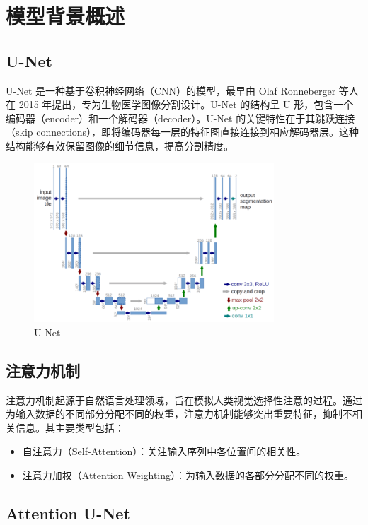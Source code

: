 \documentclass[a4paper,12pt]{report}
\begin{document}
\section{模型背景概述}

\subsection{U-Net}
U-Net 是一种基于卷积神经网络（CNN）的模型，最早由 Olaf Ronneberger 等人在 2015 年提出，专为生物医学图像分割设计。U-Net 的结构呈 U 形，包含一个编码器（encoder）和一个解码器（decoder）。U-Net 的关键特性在于其跳跃连接（skip connections），即将编码器每一层的特征图直接连接到相应解码器层。这种结构能够有效保留图像的细节信息，提高分割精度。

\begin{figure}[H]
    \centering
    \includegraphics[width=0.8\textwidth]{figure/U-Net.png}
    \caption{U-Net}
    \label{fig:login}
\end{figure}


\subsection{注意力机制}
注意力机制起源于自然语言处理领域，旨在模拟人类视觉选择性注意的过程。通过为输入数据的不同部分分配不同的权重，注意力机制能够突出重要特征，抑制不相关信息。其主要类型包括：
\begin{itemize}
    \item 自注意力（Self-Attention）：关注输入序列中各位置间的相关性。
    \item 注意力加权（Attention Weighting）：为输入数据的各部分分配不同的权重。
\end{itemize}

\subsection{Attention U-Net}
\end{document}
